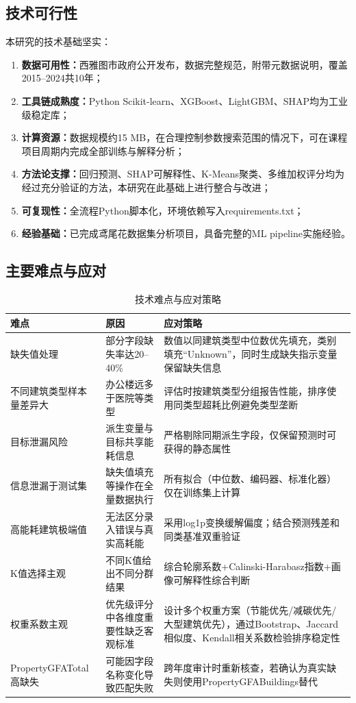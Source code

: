 \subsection{技术可行性}

本研究的技术基础坚实：

\begin{enumerate}
    \item \textbf{数据可用性：}西雅图市政府公开发布，数据完整规范，附带元数据说明，覆盖2015--2024共10年；
    \item \textbf{工具链成熟度：}Python Scikit-learn、XGBoost、LightGBM、SHAP均为工业级稳定库；
    \item \textbf{计算资源：}数据规模约15 MB，在合理控制参数搜索范围的情况下，可在课程项目周期内完成全部训练与解释分析；
    \item \textbf{方法论支撑：}回归预测、SHAP可解释性、K-Means聚类、多维加权评分均为经过充分验证的方法，本研究在此基础上进行整合与改进；
    \item \textbf{可复现性：}全流程Python脚本化，环境依赖写入requirements.txt；
    \item \textbf{经验基础：}已完成鸢尾花数据集分析项目，具备完整的ML pipeline实施经验。
\end{enumerate}

\subsection{主要难点与应对}

\begin{table}[H]
\centering
\caption{技术难点与应对策略}
\label{tab:challenges}
\begin{tabular}{p{3cm}p{4cm}p{5cm}}
\hline
\textbf{难点} & \textbf{原因} & \textbf{应对策略} \\
\hline
缺失值处理 & 部分字段缺失率达20--40\% & 数值以同建筑类型中位数优先填充，类别填充``Unknown''，同时生成缺失指示变量保留缺失信息 \\
\hline
不同建筑类型样本量差异大 & 办公楼远多于医院等类型 & 评估时按建筑类型分组报告性能，排序使用同类型超耗比例避免类型垄断 \\
\hline
目标泄漏风险 & 派生变量与目标共享能耗信息 & 严格剔除同期派生字段，仅保留预测时可获得的静态属性 \\
\hline
信息泄漏于测试集 & 缺失值填充等操作在全量数据执行 & 所有拟合（中位数、编码器、标准化器）仅在训练集上计算 \\
\hline
高能耗建筑极端值 & 无法区分录入错误与真实高耗能 & 采用log1p变换缓解偏度；结合预测残差和同类基准双重验证 \\
\hline
K值选择主观 & 不同K值给出不同分群结果 & 综合轮廓系数+Calinski-Harabasz指数+画像可解释性综合判断 \\
\hline
权重系数主观 & 优先级评分中各维度重要性缺乏客观标准 & 设计多个权重方案（节能优先/减碳优先/大型建筑优先），通过Bootstrap、Jaccard相似度、Kendall相关系数检验排序稳定性 \\
\hline
PropertyGFATotal高缺失 & 可能因字段名称变化导致匹配失败 & 跨年度审计时重新核查，若确认为真实缺失则使用PropertyGFABuildings替代 \\
\hline
\end{tabular}
\end{table}
